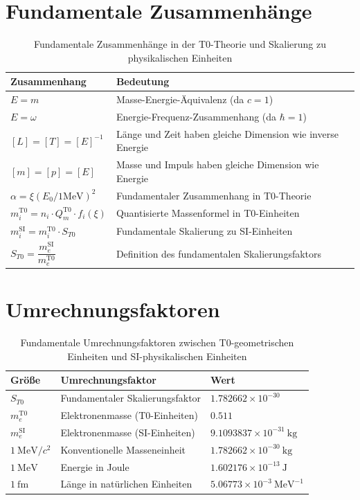 	\section{Fundamentale Zusammenhänge}
	
	\begin{table}[h]
		\centering
		\begin{tabular}{p{4cm}p{10cm}}
			\toprule
			\textbf{Zusammenhang} & \textbf{Bedeutung} \\
			\midrule
			$E = m$ & Masse-Energie-Äquivalenz (da $c=1$) \\
			$E = \omega$ & Energie-Frequenz-Zusammenhang (da $\hbar=1$) \\
			$[L] = [T] = [E]^{-1}$ & Länge und Zeit haben gleiche Dimension wie inverse Energie \\
			$[m] = [p] = [E]$ & Masse und Impuls haben gleiche Dimension wie Energie \\
			$\alpha = \xi (E_0/1\mathrm{MeV})^2$ & Fundamentaler Zusammenhang in T0-Theorie \\
			$m_i^{\mathrm{T0}} = n_i \cdot Q_m^{\mathrm{T0}} \cdot f_i(\xi)$ & Quantisierte Massenformel in T0-Einheiten \\
			$m_i^{\mathrm{SI}} = m_i^{\mathrm{T0}} \cdot S_{T0}$ & Fundamentale Skalierung zu SI-Einheiten \\
			$S_{T0} = \dfrac{m_e^{\mathrm{SI}}}{m_e^{\mathrm{T0}}}$ & Definition des fundamentalen Skalierungsfaktors \\
			\bottomrule
		\end{tabular}
		\caption{Fundamentale Zusammenhänge in der T0-Theorie und Skalierung zu physikalischen Einheiten}
	\end{table}
	
	\section{Umrechnungsfaktoren}
	
	\begin{table}[h]
		\centering
		\begin{tabular}{lll}
			\toprule
			\textbf{Größe} & \textbf{Umrechnungsfaktor} & \textbf{Wert} \\
			\midrule
			$S_{T0}$ & Fundamentaler Skalierungsfaktor & $1.782662 \times 10^{-30}$ \\
			$m_e^{\mathrm{T0}}$ & Elektronenmasse (T0-Einheiten) & $0.511$ \\
			$m_e^{\mathrm{SI}}$ & Elektronenmasse (SI-Einheiten) & $9.1093837 \times 10^{-31}~\mathrm{kg}$ \\
			$1~\mathrm{MeV}/c^2$ & Konventionelle Masseneinheit & $1.782662 \times 10^{-30}~\mathrm{kg}$ \\
			$1~\mathrm{MeV}$ & Energie in Joule & $1.602176 \times 10^{-13}~\mathrm{J}$ \\
			$1~\mathrm{fm}$ & Länge in natürlichen Einheiten & $5.06773 \times 10^{-3}~\mathrm{MeV}^{-1}$ \\
			\bottomrule
		\end{tabular}
		\caption{Fundamentale Umrechnungsfaktoren zwischen T0-geometrischen Einheiten und SI-physikalischen Einheiten}
	\end{table}
	